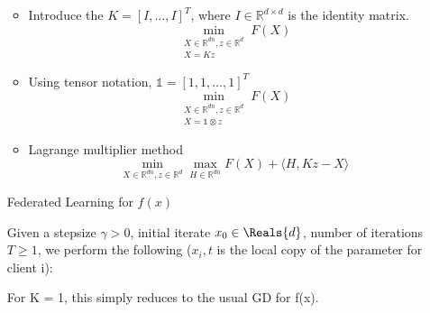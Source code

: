 \begin{itemize}
\begin{itemize}
\begin{equation}
    \end{equation}
\item Introduce the $K = [I,...,I]^T$, where $I \in \mathbb{R}^{d\times d}$ is the identity matrix.
\begin{equation}
    \min_{ \substack{ X \in \mathbb{R}^{dn}, z \in \mathbb{R}^d \\X = Kz }} F(X)
\end{equation}
\item Using tensor notation, $\mathds{1} = [1,1,\dots, 1]^T $
\begin{equation}
    \min_{ \substack{X \in \mathbb{R}^{dn}, z \in \mathbb{R}^d \\ X = \mathds{1} \otimes z  } } F(X)
\end{equation}
\item Lagrange multiplier method 
\begin{equation}
    \min_{X \in \mathbb{R}^{dn},z \in \mathbb{R}^d} \max_{H \in \mathbb{R}^{dn}} F(X) + \langle H,Kz - X \rangle 
\end{equation}
\end{itemize}
\newpage

\begin{algorithm}
\caption{Federated Learning for $f(x)$}\label{alg:FedLearing}
Given a stepsize $\gamma > 0$, initial iterate $x_0 \in \Reals{d}$, number of iterations $T \geq 1$, we perform the following ($x_i,t$ is the local copy of the parameter for client i):  
\begin{algorithmic}
    \EndFor
\EndFor
\end{algorithmic}
\end{algorithm}

\begin{remark}
For K = 1, this simply reduces to the usual GD for f(x).
\end{remark}


\end{itemize}
